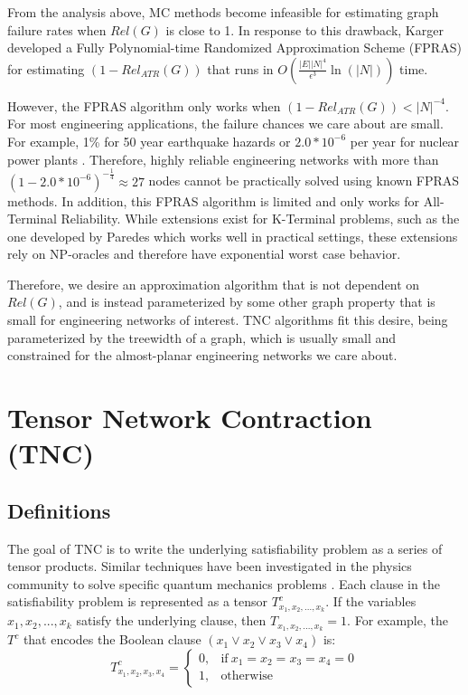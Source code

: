 \documentclass[12pt,twocolumn]{article}
\begin{document}
From the analysis above, MC methods become infeasible for estimating graph failure rates when \(Rel(G)\) is close to 1. In response to this drawback, Karger \cite{karger2001randomized} developed a Fully Polynomial-time Randomized Approximation Scheme (FPRAS) for estimating \((1-Rel_{ATR}(G))\) that runs in \(O(\frac{|E||N|^4}{\epsilon^3}\ln(|N|))\) time.

However, the FPRAS algorithm only works when \((1-Rel_{ATR}(G))<|N|^{-4}\). For most engineering applications, the failure chances we care about are small. For example, 1\% for 50 year earthquake hazards \cite{IBC_2017} or \(2.0*10^{-6}\) per year for nuclear power plants \cite{NRC_2010}. Therefore, highly reliable engineering networks with more than \((1-2.0*10^{-6})^{-\frac{1}{4}} \approx 27\) nodes cannot be practically solved using known FPRAS methods. In addition, this FPRAS algorithm is limited and only works for All-Terminal Reliability. While extensions exist for K-Terminal problems, such as the one developed by Paredes \cite{paredes2019principled} which works well in practical settings, these extensions rely on NP-oracles and therefore have exponential worst case behavior.

Therefore, we desire an approximation algorithm that is not dependent on \(Rel(G)\), and is instead parameterized by some other graph property that is small for engineering networks of interest. TNC algorithms fit this desire, being parameterized by the treewidth of a graph, which is usually small and constrained for the almost-planar engineering networks we care about.

\hypertarget{tensor-network-contraction-tnc}{%
\section{Tensor Network Contraction (TNC)}\label{tensor-network-contraction-tnc}}

\hypertarget{definitions}{%
\subsection{Definitions}\label{definitions}}

The goal of TNC is to write the underlying satisfiability problem as a series of tensor products. Similar techniques have been investigated in the physics community to solve specific quantum mechanics problems \cite{pan2020contracting} \cite{biamonte2019lectures}. Each clause in the satisfiability problem is represented as a tensor \(T^c_{x_1,x_2,...,x_k}\). If the variables \(x_1,x_2,...,x_k\) satisfy the underlying clause, then \(T_{x_1,x_2,...,x_k}=1\). For example, the \(T^c\) that encodes the Boolean clause \((x_1 \lor x_2 \lor x_3 \lor x_4)\) is: \begin{equation*}
T^c_{x_1,x_2,x_3,x_4}=
\begin{cases}
  0, & \text{if}\ x_1=x_2=x_3=x_4=0 \\
  1, & \text{otherwise}
\end{cases}
\end{equation*}
\end{document}
